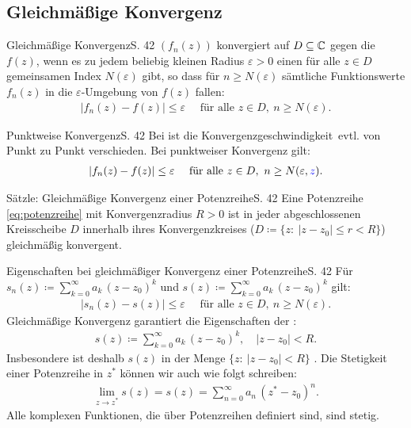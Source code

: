 \subsection{Gleichmäßige Konvergenz}

\begin{bemerkung}{Gleichmäßige Konvergenz}{S. 42}
  $\left( f_n(z) \right)$ konvergiert auf $D \subseteq \mathbb{C}$  gegen die  $f(z)$, wenn es zu jedem beliebig kleinen Radius $\varepsilon > 0$ einen für alle $z \in D$ gemeinsamen Index $N(\varepsilon)$ gibt, so dass für $n \geq N(\varepsilon)$ sämtliche Funktionswerte $f_n(z)$ in die $\varepsilon$-Umgebung von $f(z)$ fallen:
  \begin{align}
    \left| f_n(z) - f(z) \right| \leq \varepsilon \quad \text{ für alle } z \in D,\ n \geq N(\varepsilon) .
  \end{align}
\end{bemerkung}

\begin{bemerkung}{Punktweise Konvergenz}{S. 42}
  Bei  ist die \glqq Konvergenzgeschwindigkeit\grqq\ evtl. von Punkt zu Punkt verschieden.
  Bei punktweiser Konvergenz gilt:
  \begin{align}
    \left| f_n(z) - f(z) \right| \leq \varepsilon \quad \text{ für alle } z \in D,\ n \geq N(\varepsilon, \textcolor{blue}{z}) .
  \end{align}
\end{bemerkung}

\begin{bemerkung}{Sätzle: Gleichmäßige Konvergenz einer Potenzreihe}{S. 42}
  Eine Potenzreihe \eqref{eq:potenzreihe} mit Konvergenzradius $R > 0$ ist in jeder abgeschlossenen Kreisscheibe $D$ innerhalb ihres Konvergenzkreises ($D \coloneqq \{ z:\ \left| z - z_0 \right| \leq r < R \}$) gleichmäßig konvergent.
\end{bemerkung}

\begin{bemerkung}{Eigenschaften bei gleichmäßiger Konvergenz einer Potenzreihe}{S. 42}
  Für $\displaystyle s_n(z) \coloneqq \sum_{k=0}^\infty a_k \, (z - z_0)^k$ und $\displaystyle s(z) \coloneqq \sum_{k=0}^\infty a_k \, (z - z_0)^k$ gilt:
  \begin{align}
    \left| s_n(z) - s(z) \right| \leq \varepsilon \quad \text{ für alle } z \in D,\ n \geq N(\varepsilon) .
  \end{align}
  Gleichmäßige Konvergenz garantiert die Eigenschaften der :
  \begin{align}
    s(z) \coloneqq \sum_{k=0}^\infty a_k \, (z - z_0)^k , \quad | z - z_0 | < R .
  \end{align}
  Insbesondere ist deshalb $s(z)$ in der Menge $\{ z:\ | z - z_0 | < R \}$ .
  Die Stetigkeit einer Potenzreihe in $z^*$ können wir auch wie folgt schreiben:
  \begin{align}
    \lim_{z \to z^*} s(z) = s(z) = \sum_{n=0}^\infty a_n \, (z^* - z_0)^n .
  \end{align}
  Alle komplexen Funktionen, die über Potenzreihen definiert sind, sind stetig.
\end{bemerkung}

